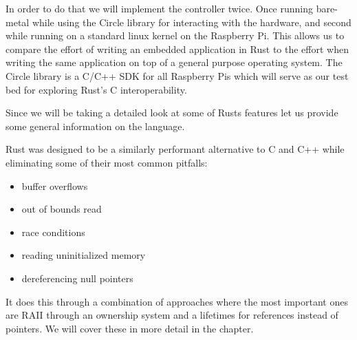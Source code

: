 In order to do that we will implement the controller twice.
Once running bare-metal while using the Circle library for interacting with the hardware,
and second while running on a standard linux kernel on the Raspberry Pi.
This allows us to compare the effort of writing an embedded application in Rust to the effort
when writing the same application on top of a general purpose operating system.
The Circle library is a C/C++ SDK for all Raspberry Pis which will serve as our test bed for exploring Rust's C interoperability.

Since we will be taking a detailed look at some of Rusts features let us provide some general information on the language.

Rust was designed to be a similarly performant alternative to C and C++ while eliminating some of their most common pitfalls:\\
\begin{itemize}
    \item buffer overflows
    \item out of bounds read
    \item race conditions
    \item reading uninitialized memory
    \item dereferencing null pointers
\end{itemize}

It does this through a combination of approaches where the most important ones are RAII through an ownership system and a lifetimes for references instead of pointers.
We will cover these in more detail in the  chapter.
